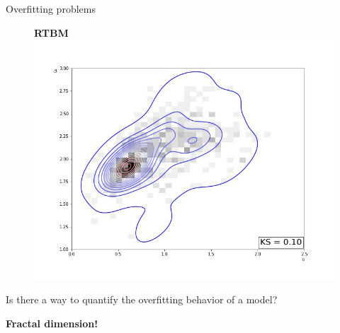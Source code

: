 \documentclass[10pt]{beamer}
\begin{document}
\begin{frame}{Overfitting problems}
\begin{figure}[!htb]
        \endminipage\hfill
        \centering
        \textbf{RTBM}
          \includegraphics[width=\linewidth]{figures/uranium15_rtbm_6_contour.jpg}
        \endminipage
        \label{fig:birds}
        \end{figure}
        \centering
        Is there a way to quantify the overfitting behavior of a model?
        
        \pause \textbf{Fractal dimension!}
\end{frame}
\end{document}
